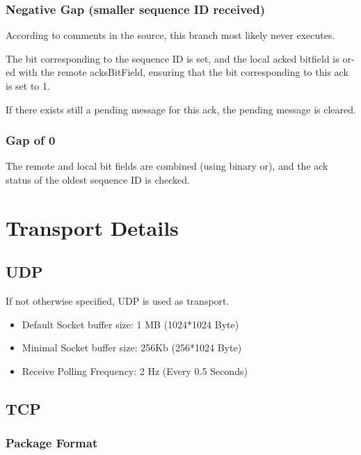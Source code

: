 \subsubsection{Negative Gap (smaller sequence ID received)}

According to comments in the source, this branch most likely never executes.

The bit corresponding to the sequence ID is set, and the local acked bitfield is or-ed with the remote acksBitField, ensuring that the bit corresponding to this ack is set to 1. 

If there exists still a pending message for this ack, the pending message is cleared.

\subsubsection{Gap of 0}

The remote and local bit fields are combined (using binary or), and the ack status of the oldest sequence ID is checked.

\section{Transport Details}

\subsection{UDP}
If not otherwise specified, UDP is used as transport.

\begin{itemize}
	\item Default Socket buffer size: 1 MB (1024*1024 Byte)
	\item Minimal Socket buffer size: 256Kb (256*1024 Byte)
	\item Receive Polling Frequency: 2 Hz (Every 0.5 Seconds)
\end{itemize}

\subsection{TCP}

\subsubsection{Package Format}

\begin{messagedef}
\end{messagedef}

